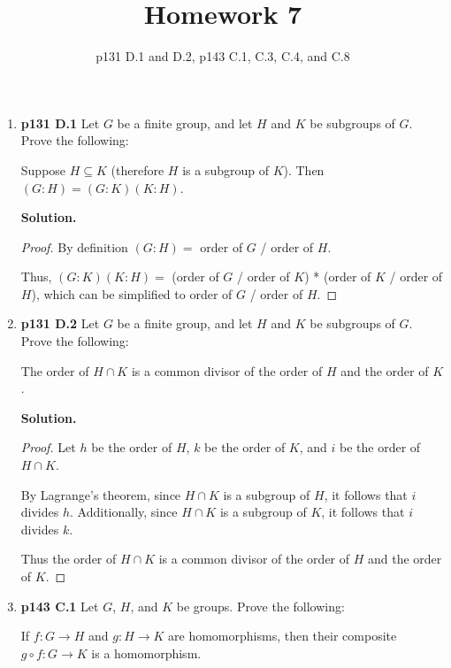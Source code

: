 \documentclass[11pt]{article}
\begin{document}
\title{Homework 7}
\date{p131 D.1 and D.2, p143 C.1, C.3, C.4, and C.8}
\maketitle

\thispagestyle{fancy}  
\pagestyle{fancy}      

\begin{enumerate}

\item {\bfseries p131 D.1} Let $G$ be a finite group, and let $H$ and $K$ be subgroups of $G$. Prove the following:
	
	Suppose $H \subseteq K$ (therefore $H$ is a subgroup of $K$). Then $(G:H)=(G:K)(K:H)$.
  
	{\bfseries Solution.}
	
	\begin{proof}
	By definition $(G:H) =$ order of $G$ / order of $H$.
	
	Thus, $(G:K)(K:H) =$ (order of $G$ / order of $K$) * (order of $K$ / order of $H$), which can be simplified to order of $G$ / order of $H$.
	\end{proof}


\item {\bfseries p131 D.2} Let $G$ be a finite group, and let $H$ and $K$ be subgroups of $G$. Prove the following:
	
	The order of $H \cap K$ is a common divisor of the order of $H$ and the order of $K$.
  
	{\bfseries Solution.}
	
	\begin{proof}
	Let $h$ be the order of $H$, $k$ be the order of $K$, and $i$ be the order of $H \cap K$.
	
	By Lagrange's theorem, since $H \cap K$ is a subgroup of $H$, it follows that $i$ divides $h$. Additionally, since $H \cap K$ is a subgroup of $K$, it follows that $i$ divides $k$.
	
	Thus the order of $H \cap K$ is a common divisor of the order of $H$ and the order of $K$.
	\end{proof}

\item {\bfseries p143 C.1} Let $G$, $H$, and $K$ be groups. Prove the following:
 
	If $f : G \rightarrow H$ and $g : H \rightarrow K$ are homomorphisms, then their composite $g \circ f : G \rightarrow K$ is a homomorphism.
  

\end{enumerate}
\end{document}
